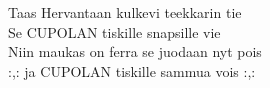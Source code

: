 
            Taas Hervantaan kulkevi teekkarin tie \\
            Se CUPOLAN tiskille snapsille vie \\
            Niin maukas on ferra se juodaan nyt pois \\
            :,: ja CUPOLAN tiskille sammua vois :,: \\
